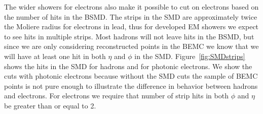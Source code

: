 The wider showers for electrons also make it possible to cut on electrons based on the number of hits in the BSMD. The strips in the SMD are approximately twice the Moliere radius for electrons in lead, thus for developed EM showers we expect to see hits in multiple strips. Most hadrons will not leave hits in the BSMD, but since we are only considering reconstructed points in the BEMC we know that we will have at least one hit in both $\eta$ and $\phi$ in the SMD. Figure~\ref{fig:SMDstrips} shows the hits in the SMD for hadrons and for photonic electrons. We show the cuts with photonic electrons because without the SMD cuts the sample of BEMC points is not pure enough to illustrate the difference in behavior between hadrons and electrons. For electrons we require that number of strip hits in both $\phi$ and $\eta$ be greater than or equal to 2.

